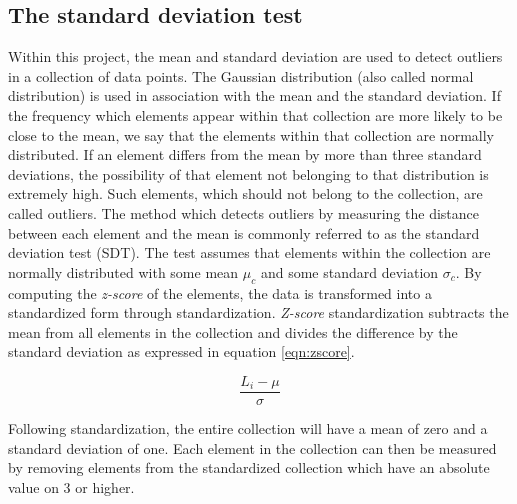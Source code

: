 \subsection{The standard deviation test}
Within this project, the mean and standard deviation are used to detect outliers in a collection of data points. The Gaussian distribution (also called normal distribution) is used in association with the mean and the standard deviation. If the frequency which elements appear within that collection are more likely to be close to the mean, we say that the elements within that collection are normally distributed. If an element differs from the mean by more than three standard deviations, the possibility of that element not belonging to that distribution is extremely high. Such elements, which should not belong to the collection, are called outliers. The method which detects outliers by measuring the distance between each element and the mean is commonly referred to as the standard deviation test (SDT). The test assumes that elements within the collection are normally distributed with some mean $\mu_c$ and some standard deviation $\sigma_c$. By computing the \textit{z-score} of the elements, the data is transformed into a standardized form through standardization. \textit{Z-score} standardization subtracts the mean from all elements in the collection and divides the difference by the standard deviation as expressed in equation \ref{eqn:zscore}.

\begin{equation}
\label{eqn:zscore}
 \frac{L_i - \mu} {\sigma}
\end{equation}

Following standardization, the entire collection will have a mean of zero and a standard deviation of one. Each element in the collection can then be measured by removing elements from the standardized collection which have an absolute value on 3 or higher.

